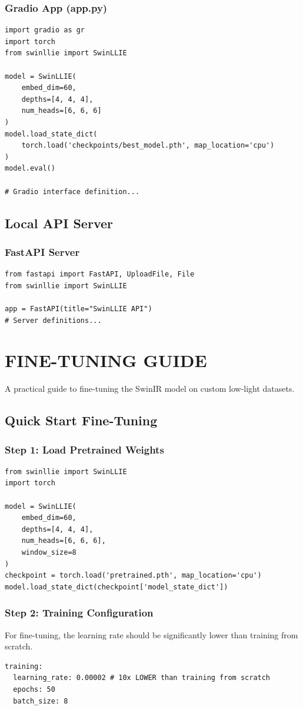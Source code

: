 \documentclass[12pt, a4paper]{report}
\begin{document}
\subsubsection{Gradio App (app.py)}
\begin{verbatim}
import gradio as gr
import torch
from swinllie import SwinLLIE

model = SwinLLIE(
    embed_dim=60,
    depths=[4, 4, 4],
    num_heads=[6, 6, 6]
)
model.load_state_dict(
    torch.load('checkpoints/best_model.pth', map_location='cpu')
)
model.eval()

# Gradio interface definition...
\end{verbatim}

\subsection{Local API Server}
\subsubsection{FastAPI Server}
\begin{verbatim}
from fastapi import FastAPI, UploadFile, File
from swinllie import SwinLLIE

app = FastAPI(title="SwinLLIE API")
# Server definitions...
\end{verbatim}

\section{FINE-TUNING GUIDE}
A practical guide to fine-tuning the SwinIR model on custom low-light datasets.

\subsection{Quick Start Fine-Tuning}
\subsubsection{Step 1: Load Pretrained Weights}
\begin{verbatim}
from swinllie import SwinLLIE
import torch

model = SwinLLIE(
    embed_dim=60,
    depths=[4, 4, 4],
    num_heads=[6, 6, 6],
    window_size=8
)
checkpoint = torch.load('pretrained.pth', map_location='cpu')
model.load_state_dict(checkpoint['model_state_dict'])
\end{verbatim}

\subsubsection{Step 2: Training Configuration}
For fine-tuning, the learning rate should be significantly lower than training from scratch.
\begin{verbatim}
training:
  learning_rate: 0.00002 # 10x LOWER than training from scratch
  epochs: 50
  batch_size: 8
\end{verbatim}
\end{document}
